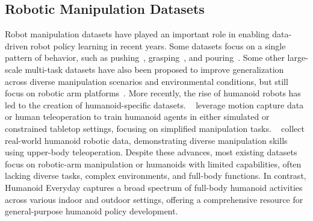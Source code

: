 \documentclass[letterpaper, 10pt, conference]{ieeeconf}
\begin{document}
\subsection{Robotic Manipulation Datasets}
Robot manipulation datasets have played an important role in enabling data-driven robot policy learning in recent years. Some datasets focus on a single pattern of behavior, such as pushing~\cite{dasari2019robonet, finn2017deep, finn2016unsupervised}, grasping~\cite{pinto2016supersizing, kappler2015leveraging, mahler2017dex, depierre2018jacquard}, and pouring~\cite{lin2023pourit, burns2022look}. Some other large-scale multi-task datasets have also been proposed to improve generalization across diverse manipulation scenarios and environmental conditions, but still focus on robotic arm platforms~\cite{o2024open, walke2023bridgedata, bousmalis2023robocat}. More recently, the rise of humanoid robots has led to the creation of humanoid-specific datasets. ~\cite{wagener2022mocapact, qiu2025-humanpolicy, fourier2025actionnet} leverage motion capture data or human teleoperation to train humanoid agents in either simulated or constrained tabletop settings, focusing on simplified manipulation tasks. ~\cite{ze2024generalizable, bu2025agibot} collect real-world humanoid robotic data, demonstrating diverse manipulation skills using upper-body teleoperation.
Despite these advances, most existing datasets focus on robotic-arm manipulation or humanoids with limited capabilities, often lacking diverse tasks, complex environments, and full-body functions. In contrast, Humanoid Everyday captures a broad spectrum of full-body humanoid activities across various indoor and outdoor settings, offering a comprehensive resource for general-purpose humanoid policy development.\par


\end{document}
